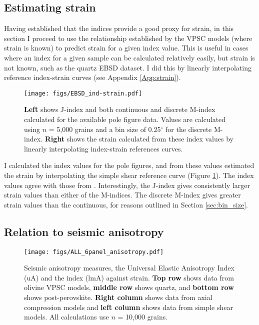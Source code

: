 \documentclass[a4paper,12pt,twoside]{report}
\numberwithin{equation}{chapter}
\begin{document}
\subsection{Estimating strain}

Having established that the indices provide a good proxy for strain, in this section I proceed to use the relationship established by the VPSC models (where strain is known) to predict strain for a given index value. This is useful in cases where an index for a given sample can be calculated relatively easily, but strain is not known, such as the quartz EBSD dataset. I did this by linearly interpolating reference index-strain curves (see Appendix \ref{App:strain}).


\begin{figure}[h]
  \centering
    \texttt{[image: figs/EBSD\_ind-strain.pdf]}
  \caption[Relationship of indices to strain (quartz EBSD)]{\textbf{Left} shows J-index and both continuous and discrete M-index calculated for the available pole figure data. Values are calculated using $n$ = 5,000 grains and a bin size of 0.25$^\circ$ for the discrete M-index. \textbf{Right} shows the strain calculated from these index values by linearly interpolating index-strain references curves.} 
  \label{fig:indices_vs_strain_qtz_EBSD}
\end{figure} 

I calculated the index values for the pole figures, and from these values estimated the strain by interpolating the simple shear reference curve (Figure \ref{fig:indices_vs_strain_qtz_EBSD}). The index values agree with those from \cite{ParsonsThesis}. Interestingly, the J-index gives consistently larger strain values than either of the M-indices. The discrete M-index gives greater strain values than the continuous, for reasons outlined in Section \ref{sec:bin_size}.  

\subsection{Relation to seismic anisotropy}


\begin{figure*}[p]
  \centering
    \texttt{[image: figs/ALL\_6panel\_anisotropy.pdf]}
  \caption[Anisotropy measures and strain]{Seismic anisotropy measures, the Universal Elastic Anisotropy Index (uA) and the \cite{Ledbetter2006} index (lmA) against strain. \textbf{Top row} shows data from olivine VPSC models, \textbf{middle row} shows quartz, and \textbf{bottom row} shows post-perovskite. \textbf{Right column} shows data from axial compression models and \textbf{left column} shows data from simple shear models. All calculations use $n$ = 10,000 grains.} 
  \label{fig:ani_vs_strain}
\end{figure*} 
\end{document}
